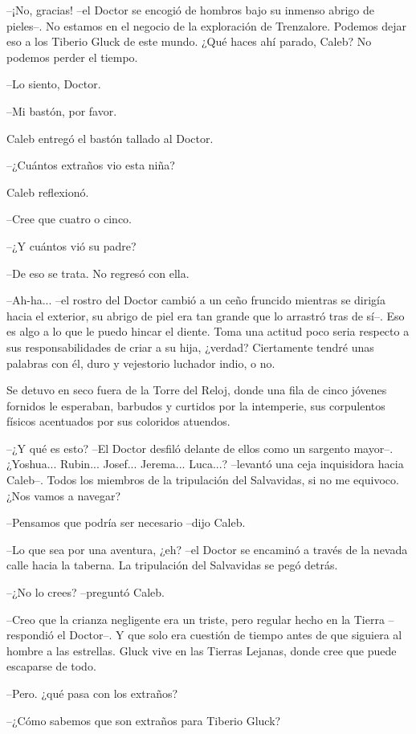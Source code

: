--¡No, gracias! --el Doctor se encogió de hombros bajo su inmenso abrigo de pieles--. No estamos en el negocio de la exploración de Trenzalore. Podemos dejar eso a los Tiberio Gluck de este mundo. ¿Qué haces ahí parado, Caleb? No podemos perder el tiempo.
 
--Lo siento, Doctor.
 
--Mi bastón, por favor.
 
Caleb entregó el bastón tallado al Doctor.
 
--¿Cuántos extraños vio esta niña?
 
Caleb reflexionó.
 
--Cree que cuatro o cinco.
 
--¿Y cuántos vió su padre?
 
--De eso se trata. No regresó con ella.
 
--Ah-ha... --el rostro del Doctor cambió a un ceño fruncido mientras se dirigía hacia el exterior, su abrigo de piel era tan grande que lo arrastró tras de sí--. Eso es algo a lo que le puedo hincar el diente. Toma una actitud poco seria respecto a sus responsabilidades de criar a su hija, ¿verdad? Ciertamente tendré unas palabras con él, duro y vejestorio luchador indio, o no.
 
Se detuvo en seco fuera de la Torre del Reloj, donde una fila de cinco jóvenes fornidos le esperaban, barbudos y curtidos por la intemperie, sus corpulentos físicos acentuados por sus coloridos atuendos.
 
--¿Y qué es esto? --El Doctor desfiló delante de ellos como un sargento mayor--. ¿Yoshua... Rubin... Josef... Jerema... Luca...? --levantó una ceja inquisidora hacia Caleb--. Todos los miembros de la tripulación del Salvavidas, si no me equivoco. ¿Nos vamos a navegar?
 
--Pensamos que podría ser necesario --dijo Caleb.
 
--Lo que sea por una aventura, ¿eh? --el Doctor se encaminó a través de la nevada calle hacia la taberna. La tripulación del Salvavidas se pegó detrás.
 
--¿No lo crees? --preguntó Caleb.
 
--Creo que la crianza negligente era un triste, pero regular hecho en la Tierra --respondió el Doctor--. Y que solo era cuestión de tiempo antes de que siguiera al hombre a las estrellas. Gluck vive en las Tierras Lejanas, donde cree que puede escaparse de todo.
 
--Pero. ¿qué pasa con los extraños?
 
--¿Cómo sabemos que son extraños para Tiberio Gluck?
 
